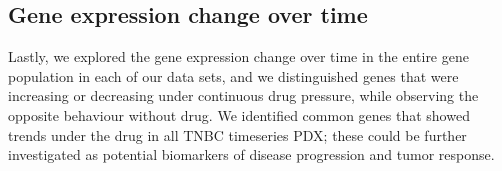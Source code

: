 \subsection{Gene expression change over time}
Lastly, we explored the gene expression change over time in the entire gene population in each of our data sets, and we distinguished genes that were increasing or decreasing under continuous drug pressure, while observing the opposite behaviour without drug. We identified common genes that showed trends under the drug in all TNBC timeseries PDX; these could be further investigated as potential biomarkers of disease progression and tumor response.


